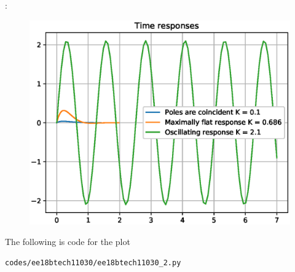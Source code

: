 \begin{enumerate}[label=\arabic*.,ref=\theenumi]
\solution :
\begin{figure}[!ht]
\centering
  \includegraphics[width=\columnwidth]{./figs/ee18btech11030/ee18btech11030_fc2.eps}
\caption{}
\label{fig:ee18btech11030_fig4} 
\end{figure}

The following is code for the plot
\begin{lstlisting}
codes/ee18btech11030/ee18btech11030_2.py
\end{lstlisting}
\begin{table}[!ht]
\centering

\caption{}
\label{table:ee18btech11030_table}
\end{table}
\end{enumerate}
